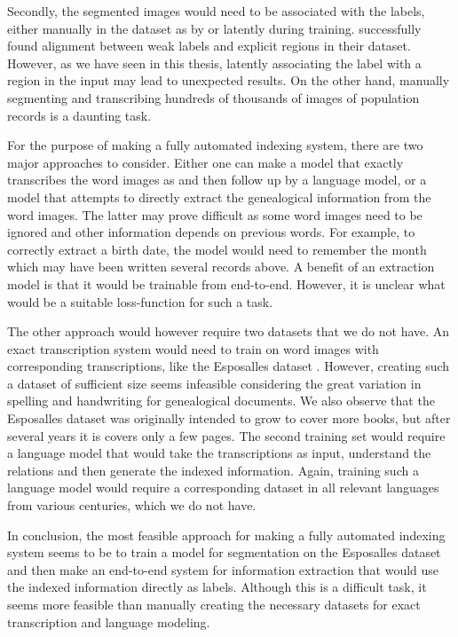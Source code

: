 Secondly, the segmented images would need to be associated with the labels, either manually in the dataset as by \textcite{esposalles} or latently during training.
\textcite{VisualSemanticAlignment} successfully found alignment between weak labels and explicit regions in their dataset. However, as we have seen in this thesis, latently associating the label with a region in the input may lead to unexpected results. On the other hand, manually segmenting and transcribing hundreds of thousands of images of population records is a daunting task.

For the purpose of making a fully automated indexing system, there are two major approaches to consider. Either one can make a model that exactly transcribes the word images as \textcite{FornesCnnCategorization} and then follow up by a language model, or a model that attempts to directly extract the genealogical information from the word images. The latter may prove difficult as some word images need to be ignored and other information depends on previous words. For example, to correctly extract a birth date, the model would need to remember the month which may have been written several records above.
A benefit of an extraction model is that it would be trainable from end-to-end. However, it is unclear what would be a suitable loss-function for such a task.

The other approach would however require two datasets that we do not have. An exact transcription system would need to train on word images with corresponding transcriptions, like the Esposalles dataset \cite{esposalles}. However, creating such a dataset of sufficient size seems infeasible considering the great variation in spelling and handwriting for genealogical documents. We also observe that the Esposalles dataset was originally intended to grow to cover more books, but after several years it is covers only a few pages. The second training set would require a language model that would take the transcriptions as input, understand the relations and then generate the indexed information. Again, training such a language model would require a corresponding dataset in all relevant languages from various centuries, which we do not have.

In conclusion, the most feasible approach for making a fully automated indexing system seems to be to train a model for segmentation on the Esposalles dataset \cite{esposalles} and then make an end-to-end system for information extraction that would use the indexed information directly as labels. Although this is a difficult task, it seems more feasible than manually creating the necessary datasets for exact transcription and language modeling.

